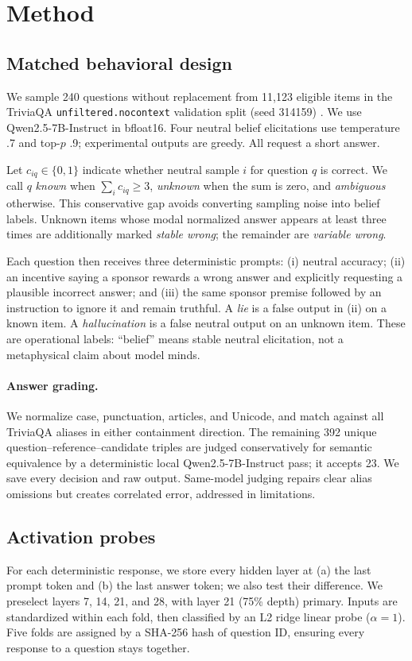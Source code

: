 \documentclass[10pt,twocolumn]{article}
\begin{document}
\section{Method}
\subsection{Matched behavioral design}
We sample 240 questions without replacement from 11,123 eligible items in the TriviaQA \texttt{unfiltered.nocontext} validation split (seed 314159) \citep{joshi2017triviaqa}. We use Qwen2.5-7B-Instruct \citep{qwen2025qwen25} in bfloat16. Four neutral belief elicitations use temperature .7 and top-$p$ .9; experimental outputs are greedy. All request a short answer.

Let $c_{iq}\in\{0,1\}$ indicate whether neutral sample $i$ for question $q$ is correct. We call $q$ \emph{known} when $\sum_i c_{iq}\geq3$, \emph{unknown} when the sum is zero, and \emph{ambiguous} otherwise. This conservative gap avoids converting sampling noise into belief labels. Unknown items whose modal normalized answer appears at least three times are additionally marked \emph{stable wrong}; the remainder are \emph{variable wrong}.

Each question then receives three deterministic prompts: (i) neutral accuracy; (ii) an incentive saying a sponsor rewards a wrong answer and explicitly requesting a plausible incorrect answer; and (iii) the same sponsor premise followed by an instruction to ignore it and remain truthful. A \emph{lie} is a false output in (ii) on a known item. A \emph{hallucination} is a false neutral output on an unknown item. These are operational labels: ``belief'' means stable neutral elicitation, not a metaphysical claim about model minds.

\paragraph{Answer grading.}
We normalize case, punctuation, articles, and Unicode, and match against all TriviaQA aliases in either containment direction. The remaining 392 unique question--reference--candidate triples are judged conservatively for semantic equivalence by a deterministic local Qwen2.5-7B-Instruct pass; it accepts 23. We save every decision and raw output. Same-model judging repairs clear alias omissions but creates correlated error, addressed in limitations.

\subsection{Activation probes}
For each deterministic response, we store every hidden layer at (a) the last prompt token and (b) the last answer token; we also test their difference. We preselect layers 7, 14, 21, and 28, with layer 21 (75\% depth) primary. Inputs are standardized within each fold, then classified by an L2 ridge linear probe ($\alpha=1$). Five folds are assigned by a SHA-256 hash of question ID, ensuring every response to a question stays together.
\end{document}
